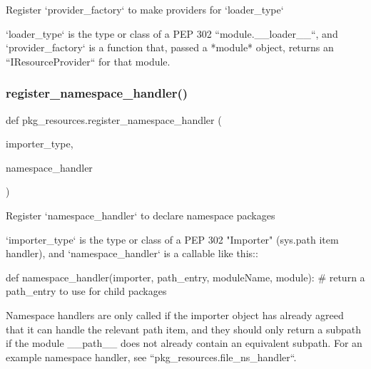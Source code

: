 \begin{DoxyVerb}Register `provider_factory` to make providers for `loader_type`

`loader_type` is the type or class of a PEP 302 ``module.__loader__``,
and `provider_factory` is a function that, passed a *module* object,
returns an ``IResourceProvider`` for that module.
\end{DoxyVerb}
 \mbox{\label{namespacepkg__resources_acfe88771fd78c58a49378665ecc42e10}} 
\subsubsection{\texorpdfstring{register\+\_\+namespace\+\_\+handler()}{register\_namespace\_handler()}}
{\footnotesize\ttfamily def pkg\+\_\+resources.\+register\+\_\+namespace\+\_\+handler (\begin{DoxyParamCaption}\item[{}]{importer\+\_\+type,  }\item[{}]{namespace\+\_\+handler }\end{DoxyParamCaption})}

\begin{DoxyVerb}Register `namespace_handler` to declare namespace packages

`importer_type` is the type or class of a PEP 302 "Importer" (sys.path item
handler), and `namespace_handler` is a callable like this::

    def namespace_handler(importer, path_entry, moduleName, module):
        # return a path_entry to use for child packages

Namespace handlers are only called if the importer object has already
agreed that it can handle the relevant path item, and they should only
return a subpath if the module __path__ does not already contain an
equivalent subpath.  For an example namespace handler, see
``pkg_resources.file_ns_handler``.
\end{DoxyVerb}
 \mbox{\label{namespacepkg__resources_a6ae462ea407849fd77ba2ee61c3ba24c}} 
